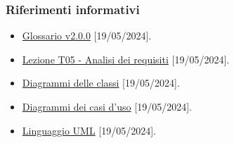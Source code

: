 \subsubsection{Riferimenti informativi}
\begin{itemize}
    \item \href{https://project-swenergy.github.io/}{Glossario v2.0.0} [19/05/2024].
    \item \href{https://www.math.unipd.it/~tullio/IS-1/2023/Dispense/T5.pdf}{Lezione T05 - Analisi dei requisiti} [19/05/2024].
    \item \href{https://www.math.unipd.it/~rcardin/swea/2023/Diagrammi%20delle%20Classi.pdf}{Diagrammi delle classi} [19/05/2024].
    \item \href{https://www.math.unipd.it/~rcardin/swea/2022/Diagrammi%20Use%20Case.pdf}{Diagrammi dei casi d'uso} [19/05/2024].
    \item \href{https://bsituos.weebly.com/uploads/2/5/2/5/25253721/applying-uml-and-patterns-3rd.pdf}{Linguaggio UML} [19/05/2024].
\end{itemize}
